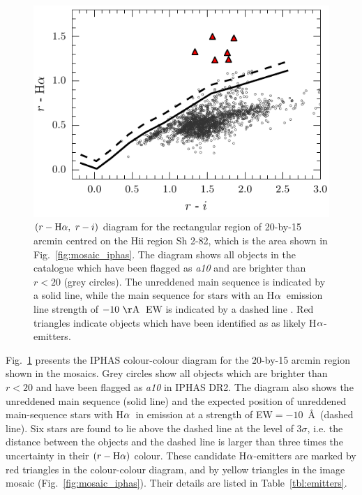 \documentclass[a4paper,useAMS,usenatbib]{mn2e}
\def\ha{\mbox{H$\rm \alpha$}}
\begin{document}
\begin{figure}
\begin{center}
  \includegraphics[width=\linewidth]{figures/sh2-82/sh2-82-ccd.pdf}
    \caption{$(r-\ha,\ r-i)$ diagram for the rectangular region of 
    20-by-15 arcmin centred on the H{\sc ii} region Sh 2-82,
    which is the area shown in Fig.~\ref{fig:mosaic_iphas}.    
    The diagram shows all objects in the catalogue
    which have been flagged as \emph{a10} and are brighter
    than $r<20$ (grey circles).
    The unreddened main sequence is indicated by a solid line,
    while the main sequence for stars with an \ha\ emission line
    strength of $-10~\rm{\AA}$~EW is indicated by a dashed line
    \citep[both based on the colour simulations by][]{Barentsen2011a}.
    Red triangles indicate objects which have been identified as
    as likely \ha-emitters.}
    \label{fig:emitters}
\end{center}
\end{figure}

Fig.~\ref{fig:emitters} presents
the IPHAS colour-colour diagram for 
the 20-by-15 arcmin region shown in the mosaics.
Grey circles show all objects
which are brighter than $r<20$
and have been flagged as \emph{a10}
in IPHAS DR2.
The diagram also shows the unreddened main sequence (solid line)
and the expected position of unreddened main-sequence stars
with \ha\ in emission
at a strength of EW$=-10$~\AA\ (dashed line).
Six stars are found to lie above the 
dashed line at the level of $3\sigma$,
i.e. the distance between the objects and the dashed line
is larger than three times the uncertainty
in their $(r-\ha)$ colour.
These candidate \ha-emitters
are marked by red triangles in the colour-colour diagram,
and by yellow triangles in the image mosaic (Fig.~\ref{fig:mosaic_iphas}).
Their details are listed in Table~\ref{tbl:emitters}.
\end{document}
